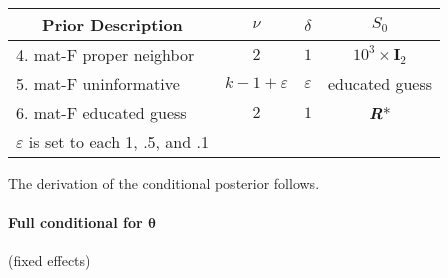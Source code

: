 \documentclass[a4paper]{article}
\begin{document}
\begin{itemize}
\begin{center}
\begin{tabular}{ c c c c }
 Prior Description & $\nu$ & $\delta$ & $S_{0}$ \\ 
 \hline
 \multicolumn{1}{l}{4. mat-F proper neighbor} & $2$ & $1$ & $10^3 \times \bm{I}_2$ \\
 \multicolumn{1}{l}{5. mat-F uninformative} & $k-1+\varepsilon$ & $\varepsilon$ & educated guess \\
 \multicolumn{1}{l}{6. mat-F educated guess} & $2$ & $1$ & \textbf{\textit{R}}* \\ 
 \hline
  \multicolumn{1}{l}{$\varepsilon$ is set to each 1, .5, and .1} 
\end{tabular}
\end{center}

\end{itemize}

The derivation of the conditional posterior follows.

\paragraph{Full conditional for $\bm{\theta}$}(fixed effects) \\
\end{document}
